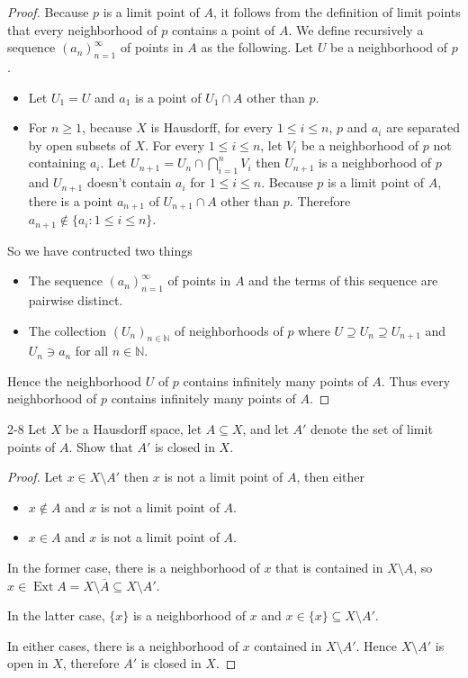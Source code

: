 \begin{proof}
	Because $p$ is a limit point of $A$, it follows from the definition of limit points that every neighborhood of $p$ contains a point of $A$. We define recursively a sequence ${(a_{n})}^{\infty}_{n=1}$ of points in $A$ as the following. Let $U$ be a neighborhood of $p$.

	\begin{itemize}
		\item Let $U_{1} = U$ and $a_{1}$ is a point of $U_{1}\cap A$ other than $p$.
		\item For $n\geq 1$, because $X$ is Hausdorff, for every $1\leq i\leq n$, $p$ and $a_{i}$ are separated by open subsets of $X$. For every $1\leq i\leq n$, let $V_{i}$ be a neighborhood of $p$ not containing $a_{i}$. Let $U_{n+1} = U_{n}\cap\bigcap^{n}_{i=1}V_{i}$ then $U_{n+1}$ is a neighborhood of $p$ and $U_{n+1}$ doesn't contain $a_{i}$ for $1\leq i\leq n$. Because $p$ is a limit point of $A$, there is a point $a_{n+1}$ of $U_{n+1}\cap A$ other than $p$. Therefore $a_{n+1}\notin\{ a_{i}: 1\leq i\leq n \}$.
	\end{itemize}

	So we have contructed two things
	\begin{itemize}
		\item The sequence ${(a_{n})}^{\infty}_{n=1}$ of points in $A$ and the terms of this sequence are pairwise distinct.
		\item The collection ${(U_{n})}_{n\in\mathbb{N}}$ of neighborhoods of $p$ where $U\supseteq U_{n}\supseteq U_{n+1}$ and $U_{n}\ni a_{n}$ for all $n\in\mathbb{N}$.
	\end{itemize}

	Hence the neighborhood $U$ of $p$ contains infinitely many points of $A$. Thus every neighborhood of $p$ contains infinitely many points of $A$.
\end{proof}

\begin{problem}{2-8}
Let $X$ be a Hausdorff space, let $A\subseteq X$, and let $A'$ denote the set of limit points of $A$. Show that $A'$ is closed in $X$.
\end{problem}

\begin{proof}
	Let $x\in X\setminus A'$ then $x$ is not a limit point of $A$, then either
	\begin{itemize}
		\item $x\notin A$ and $x$ is not a limit point of $A$.
		\item $x\in A$ and $x$ is not a limit point of $A$.
	\end{itemize}

	In the former case, there is a neighborhood of $x$ that is contained in $X\setminus A$, so $x\in \operatorname{Ext}A = X\setminus\overline{A}\subseteq X\setminus A'$.

	In the latter case, $\{ x \}$ is a neighborhood of $x$ and $x\in\{ x \}\subseteq X\setminus A'$.

	In either cases, there is a neighborhood of $x$ contained in $X\setminus A'$. Hence $X\setminus A'$ is open in $X$, therefore $A'$ is closed in $X$.
\end{proof}

